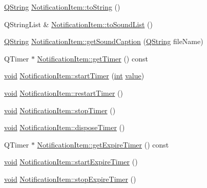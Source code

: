 \begin{DoxyCompactItemize}
\item 
\hyperlink{group___u_a_v_objects_plugin_gab9d252f49c333c94a72f97ce3105a32d}{Q\-String} \hyperlink{group__notifyplugin_gacced9ea8ef4e62bf9f126766c99514c9}{Notification\-Item\-::to\-String} ()
\item 
Q\-String\-List \& \hyperlink{group__notifyplugin_ga3fa8d750e630be2b90fbbe2ad536a55b}{Notification\-Item\-::to\-Sound\-List} ()
\item 
\hyperlink{group___u_a_v_objects_plugin_gab9d252f49c333c94a72f97ce3105a32d}{Q\-String} \hyperlink{group__notifyplugin_gadaf0f176a8851c6a9fe551bf80b61cb4}{Notification\-Item\-::get\-Sound\-Caption} (\hyperlink{group___u_a_v_objects_plugin_gab9d252f49c333c94a72f97ce3105a32d}{Q\-String} file\-Name)
\item 
Q\-Timer $\ast$ \hyperlink{group__notifyplugin_gad0b36630b519b091944bbf350ca8de5f}{Notification\-Item\-::get\-Timer} () const 
\item 
\hyperlink{group___u_a_v_objects_plugin_ga444cf2ff3f0ecbe028adce838d373f5c}{void} \hyperlink{group__notifyplugin_gaa7aa70f2843fa4dfaf65d257280afc6b}{Notification\-Item\-::start\-Timer} (\hyperlink{ioapi_8h_a787fa3cf048117ba7123753c1e74fcd6}{int} \hyperlink{glext_8h_aa0e2e9cea7f208d28acda0480144beb0}{value})
\item 
\hyperlink{group___u_a_v_objects_plugin_ga444cf2ff3f0ecbe028adce838d373f5c}{void} \hyperlink{group__notifyplugin_gacf26398de566bf5f6b947e9065841653}{Notification\-Item\-::restart\-Timer} ()
\item 
\hyperlink{group___u_a_v_objects_plugin_ga444cf2ff3f0ecbe028adce838d373f5c}{void} \hyperlink{group__notifyplugin_ga40c3dd7de6f84d1c49d6536d3bf7c310}{Notification\-Item\-::stop\-Timer} ()
\item 
\hyperlink{group___u_a_v_objects_plugin_ga444cf2ff3f0ecbe028adce838d373f5c}{void} \hyperlink{group__notifyplugin_gaa2f1891b46a9b84e08cd3cde71981655}{Notification\-Item\-::dispose\-Timer} ()
\item 
Q\-Timer $\ast$ \hyperlink{group__notifyplugin_gac3e54f4c867cf1ab32a5127dcc5dcebe}{Notification\-Item\-::get\-Expire\-Timer} () const 
\item 
\hyperlink{group___u_a_v_objects_plugin_ga444cf2ff3f0ecbe028adce838d373f5c}{void} \hyperlink{group__notifyplugin_ga1cea7db89fc4ba5cc6177e4676fc6f5b}{Notification\-Item\-::start\-Expire\-Timer} ()
\item 
\hyperlink{group___u_a_v_objects_plugin_ga444cf2ff3f0ecbe028adce838d373f5c}{void} \hyperlink{group__notifyplugin_gafff508e9352fb1a5ed40502e6845ebef}{Notification\-Item\-::stop\-Expire\-Timer} ()

\end{DoxyCompactItemize}
